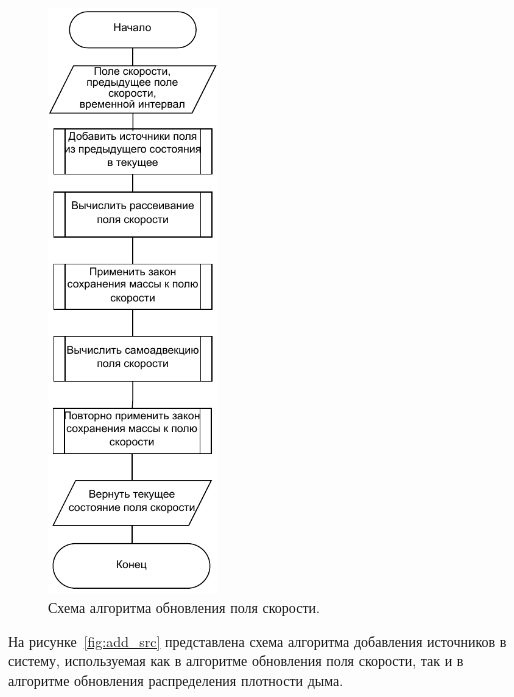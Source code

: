 \begin{figure}[H]
	\centering
	\includegraphics[width=0.4\textwidth, page=1]{assets/img/velocity_step.pdf}   
	\caption{Схема алгоритма обновления поля скорости.}
	\label{fig:vel_step}
\end{figure}

На рисунке~\ref{fig:add_src} представлена схема алгоритма добавления источников в систему, используемая как в алгоритме обновления поля скорости, так и в алгоритме обновления распределения плотности дыма.

